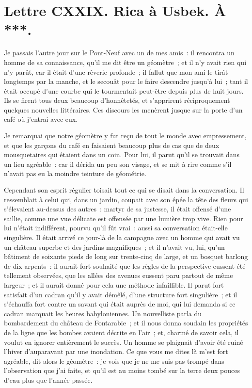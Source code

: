 \documentclass[french,twoside]{book} %
\begin{document}
\section[{Lettre CXXIX. Rica à Usbek. À ***.}]{Lettre CXXIX. Rica à Usbek. À ***.}\renewcommand{\leftmark}{Lettre CXXIX. Rica à Usbek. À ***.}

\noindent Je passais l’autre jour sur le Pont-Neuf avec un de mes amis : il rencontra un homme de sa connaissance, qu’il me dit être un géomètre ; et il n’y avait rien qui n’y parût, car il était d’une rêverie profonde ; il fallut que mon ami le tirât longtemps par la manche, et le secouât pour le faire descendre jusqu’à lui ; tant il était occupé d’une courbe qui le tourmentait peut-être depuis plus de huit jours. Ils se firent tous deux beaucoup d’honnêtetés, et s’apprirent réciproquement quelques nouvelles littéraires. Ces discours les menèrent jusque sur la porte d’un café où j’entrai avec eux.\par
Je remarquai que notre géomètre y fut reçu de tout le monde avec empressement, et que les garçons du café en faisaient beaucoup plus de cas que de deux mousquetaires qui étaient dans un coin. Pour lui, il parut qu’il se trouvait dans un lieu agréable : car il dérida un peu son visage, et se mit à rire comme s’il n’avait pas eu la moindre teinture de géométrie.\par
Cependant son esprit régulier toisait tout ce qui se disait dans la conversation. Il ressemblait à celui qui, dans un jardin, coupait avec son épée la tête des fleurs qui s’élevaient au-dessus des autres : martyr de sa justesse, il était offensé d’une saillie, comme une vue délicate est offensée par une lumière trop vive. Rien pour lui n’était indifférent, pourvu qu’il fût vrai : aussi sa conversation était-elle singulière. Il était arrivé ce jour-là de la campagne avec un homme qui avait vu un château superbe et des jardins magnifiques ; et il n’avait vu, lui, qu’un bâtiment de soixante pieds de long sur trente-cinq de large, et un bosquet barlong de dix arpents : il aurait fort souhaité que les règles de la perspective eussent été tellement observées, que les allées des avenues eussent paru partout de même largeur ; et il aurait donné pour cela une méthode infaillible. Il parut fort satisfait d’un cadran qu’il y avait démêlé, d’une structure fort singulière ; et il s’échauffa fort contre un savant qui était auprès de moi, qui lui demanda si ce cadran marquait les heures babyloniennes. Un nouvelliste parla du bombardement du château de Fontarabie ; et il nous donna soudain les propriétés de la ligne que les bombes avaient décrite en l’air ; et, charmé de savoir cela, il voulut en ignorer entièrement le succès. Un homme se plaignait d’avoir été ruiné l’hiver d’auparavant par une inondation. Ce que vous me dites là m’est fort agréable, dit alors le géomètre : je vois que je ne me suis pas trompé dans l’observation que j’ai faite, et qu’il est au moins tombé sur la terre deux pouces d’eau plus que l’année passée.\par
\end{document}
